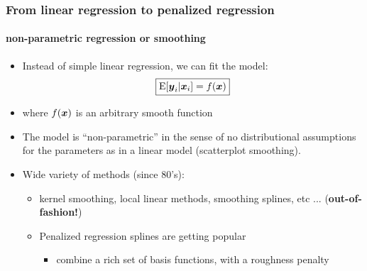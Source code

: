 \documentclass[11pt]{beamer}
\newcommand{\bfx}{\mbox{\boldmath $x$}}
\newcommand{\bfy}{\mbox{\boldmath $y$}}
\begin{document}
\begin{frame}
 \frametitle{From linear regression to penalized regression}
 	\framesubtitle{\quad non-parametric regression or smoothing}
 \vspace{-.20cm}
{\footnotesize
\begin{itemize}
\item Instead of simple linear regression, we can fit the model:
\[
\boxed{\mbox{E}[\bfy_i|\bfx_i]= f(\bfx)}
\]\vspace{-.25cm}
\item[]\quad where $f(\bfx)$ is an arbitrary \alert{smooth function} \medskip

\item The model is ``non-parametric'' in the sense of no distributional assumptions for the parameters as in a linear model (\alert{scatterplot smoothing}).\medskip


\item Wide variety of methods (since 80's):

\begin{itemize}
\item \footnotesize kernel smoothing, local linear methods, smoothing splines, etc ... ({\color{red}\bf out-of-fashion!})
\item \alert{Penalized regression splines} are getting popular
\begin{itemize}
\item \footnotesize combine a rich set of \alert{basis functions}, with a \alert{roughness penalty}
\end{itemize}
\end{itemize}
\end{itemize}
}


\vfill

\vfill

\end{frame}


\end{document}
